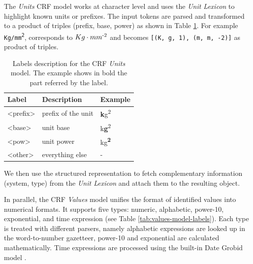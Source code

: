 \documentclass[sigconf]{acmart}
\begin{document}
The \textit{Units} CRF model works at character level and uses the \textit{Unit Lexicon} to highlight known units or prefixes. The input tokens are parsed and transformed to a product of triples (prefix, base, power) as shown in Table \ref{tab:units-model-labels}. For example \texttt{Kg/mm\textsuperscript{2}}, corresponds to \texttt{$Kg\cdot mm\textsuperscript{-2}$} and becomes \texttt{[(K, g, 1), (m, m, -2)]} as product of triples. 

\begin{table}[ht]
  \caption{Labels description for the CRF \textit{Units} model. The example shows in bold the part referred by the label. }
  \label{tab:units-model-labels}
  \begin{tabular}{lll}
    \toprule
    Label & Description & Example\\
    \midrule
    <prefix> & prefix of the unit  & \textbf{k}g\textsuperscript{2} \\
    <base> & unit base & k\textbf{g}\textsuperscript{2}\\
    <pow> & unit power & kg\textsuperscript{\textbf{2}}\\
    <other> & everything else & - \\
  \bottomrule
\end{tabular}
\end{table}

We then use the structured representation to fetch complementary information (system, type) from the \textit{Unit Lexicon} and attach them to the resulting object. 

In parallel, the CRF \textit{Values} model unifies the format of identified values into numerical formats. It supports five types: numeric, alphabetic, power-10, exponential, and time expression (see Table \ref{tab:values-model-labels}). Each type is treated with different parsers, namely alphabetic expressions are looked up in the word-to-number gazetteer, power-10 and exponential are calculated mathematically. Time expressions are processed using the built-in Date Grobid model \cite{GROBID}.
\end{document}
